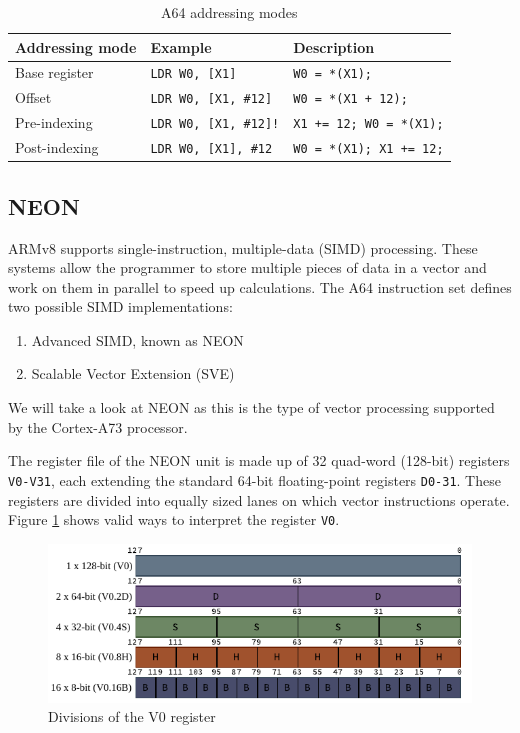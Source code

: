 \begin{table}[h!]
    \centering
    \small
    \caption{A64 addressing modes}
    \begin{tabularx}{\textwidth}{llX}
        \toprule
        Addressing mode & Example & Description \\
        \midrule
        Base register & \texttt{LDR W0, [X1]} & \texttt{W0 = *(X1);} \\
        Offset & \texttt{LDR W0, [X1, \#12]} & \texttt{W0 = *(X1 + 12);} \\
        Pre-indexing & \texttt{LDR W0, [X1, \#12]!} & \texttt{X1 += 12; W0 = *(X1);} \\
        Post-indexing & \texttt{LDR W0, [X1], \#12} & \texttt{W0 = *(X1); X1 += 12;} \\
        \bottomrule
    \end{tabularx}
\end{table}

\subsection{NEON}
\label{ss:neon}

ARMv8 supports single-instruction, multiple-data (SIMD) processing. These systems
allow the programmer to store multiple pieces of data in a vector and work on
them in parallel to speed up calculations. The A64 instruction set defines two
possible SIMD implementations:

\begin{enumerate}
    \item Advanced SIMD, known as NEON
    \item Scalable Vector Extension (SVE)
\end{enumerate}

We will take a look at NEON as this is the type of vector processing supported
by the Cortex-A73 processor.

The register file of the NEON unit is made up of 32 quad-word (128-bit)
registers \texttt{V0-V31}, each extending the standard 64-bit floating-point
registers \mbox{\texttt{D0-31}}. These registers are divided into equally sized
lanes on which vector instructions operate. Figure \ref{fig:regdivs} shows
valid ways to interpret the register \texttt{V0}.

\begin{figure}[h!]
    \centering
    \includegraphics[width=\textwidth]{Figures/V_register.pdf}
    \caption{Divisions of the V0 register}
    \label{fig:regdivs}
\end{figure}

